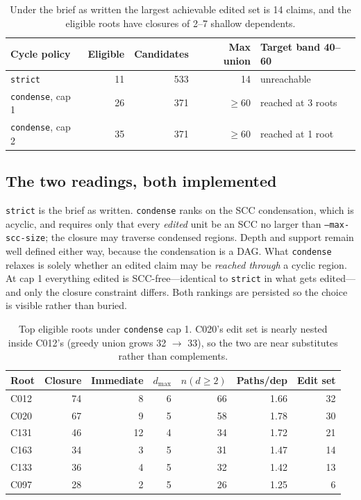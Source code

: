 \documentclass[11pt]{article}
\begin{document}
\begin{table}[h]
\centering
\begin{tabular}{lrrrl}
\toprule
Cycle policy & Eligible & Candidates & Max union & Target band 40--60 \\
\midrule
\texttt{strict}      & 11 & 533 & 14  & unreachable \\
\texttt{condense}, cap 1 & 26 & 371 & $\geq60$ & reached at 3 roots \\
\texttt{condense}, cap 2 & 35 & 371 & $\geq60$ & reached at 1 root \\
\bottomrule
\end{tabular}
\caption{Under the brief as written the largest achievable edited set is 14
claims, and the eligible roots have closures of 2--7 shallow dependents.}
\end{table}

\subsection{The two readings, both implemented}

\texttt{strict} is the brief as written. \texttt{condense} ranks on the SCC
condensation, which is acyclic, and requires only that every \emph{edited} unit
be an SCC no larger than \texttt{--max-scc-size}; the closure may traverse
condensed regions. Depth and support remain well defined either way, because the
condensation is a DAG. What \texttt{condense} relaxes is solely whether an
edited claim may be \emph{reached through} a cyclic region. At cap 1 everything
edited is SCC-free---identical to \texttt{strict} in what gets edited---and only
the closure constraint differs. Both rankings are persisted so the choice is
visible rather than buried.

\begin{table}[h]
\centering
\begin{tabular}{lrrrrrr}
\toprule
Root & Closure & Immediate & $d_{\max}$ & $n(d\geq2)$ & Paths/dep & Edit set \\
\midrule
C012 & 74 & 8  & 6 & 66 & 1.66 & 32 \\
C020 & 67 & 9  & 5 & 58 & 1.78 & 30 \\
C131 & 46 & 12 & 4 & 34 & 1.72 & 21 \\
C163 & 34 & 3  & 5 & 31 & 1.47 & 14 \\
C133 & 36 & 4  & 5 & 32 & 1.42 & 13 \\
C097 & 28 & 2  & 5 & 26 & 1.25 & 6  \\
\bottomrule
\end{tabular}
\caption{Top eligible roots under \texttt{condense} cap 1. C020's edit set is
nearly nested inside C012's (greedy union grows 32 $\to$ 33), so the two are near
substitutes rather than complements.}
\end{table}
\end{document}
